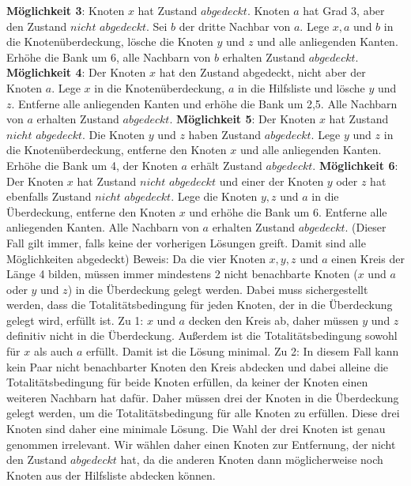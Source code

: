 \documentclass[12pt,onecolumn, notitlepage]{scrartcl}
\begin{document}
\textbf{Möglichkeit 3}:\newline
Knoten $x$ hat Zustand $abgedeckt$.  Knoten $a$ hat Grad $3$, aber den Zustand $nicht$ $abgedeckt$. Sei $b$ der dritte Nachbar von $a$. Lege $x,a$ und $b$ in die Knotenüberdeckung, lösche die Knoten $y$ und $z$ und alle anliegenden Kanten. Erhöhe die Bank um 6, alle Nachbarn von $b$ erhalten Zustand $abgedeckt$. \newline\newline
\textbf{Möglichkeit 4}:\newline
Der Knoten $x$ hat den Zustand abgedeckt, nicht aber der Knoten $a$. Lege $x$ in die Knotenüberdeckung, $a$ in die Hilfsliste und lösche $y$ und $z$. Entferne alle anliegenden Kanten und erhöhe die Bank um 2,5. Alle Nachbarn von $a$ erhalten Zustand $abgedeckt$.  \newline\newline
\textbf{Möglichkeit 5}:\newline
Der Knoten $x$ hat Zustand $nicht$ $abgedeckt$. Die Knoten $y$ und $z$ haben Zustand $abgedeckt$.  Lege $y$ und $z$ in die Knotenüberdeckung, entferne den Knoten $x$ und alle anliegenden Kanten. Erhöhe die Bank um 4, der Knoten $a$ erhält Zustand $abgedeckt$.  \newline\newline
\textbf{Möglichkeit 6}:\newline
Der Knoten $x$ hat Zustand $nicht$ $abgedeckt$ und einer der Knoten $y$ oder $z$ hat ebenfalls Zustand $nicht$ $abgedeckt$. Lege die Knoten $y,z$ und $a$ in die Überdeckung, entferne den Knoten $x$ und erhöhe die Bank um 6. Entferne alle anliegenden Kanten. Alle Nachbarn von $a$ erhalten Zustand $abgedeckt$. 
(Dieser Fall gilt immer, falls keine der vorherigen Lösungen greift. Damit sind alle Möglichkeiten abgedeckt)\newline \newline
Beweis: Da die vier Knoten $x,y,z$ und $a$ einen Kreis der Länge 4 bilden, müssen immer mindestens 2 nicht benachbarte Knoten ($x$ und $a$ oder $y$ und $z$) in die Überdeckung gelegt werden. Dabei muss sichergestellt werden, dass die Totalitätsbedingung für jeden Knoten, der in die Überdeckung gelegt wird, erfüllt ist.\newline
Zu 1: $x$ und $a$ decken den Kreis ab, daher müssen $y$ und $z$ definitiv nicht in die Überdeckung. Außerdem ist die Totalitätsbedingung sowohl für $x$ als auch $a$ erfüllt. Damit ist die Lösung minimal.\newline
Zu 2: In diesem Fall kann kein Paar nicht benachbarter Knoten den Kreis abdecken und dabei alleine die Totalitätsbedingung für beide Knoten erfüllen, da keiner der Knoten einen weiteren Nachbarn hat dafür. Daher müssen drei der Knoten in die Überdeckung gelegt werden, um die Totalitätsbedingung für alle Knoten zu erfüllen. Diese drei Knoten sind daher eine minimale Lösung. Die Wahl der drei Knoten ist genau genommen irrelevant. Wir wählen daher einen Knoten zur Entfernung, der nicht den Zustand $abgedeckt$ hat, da die anderen Knoten dann möglicherweise noch Knoten aus der Hilfsliste abdecken können. \newline
\end{document}
